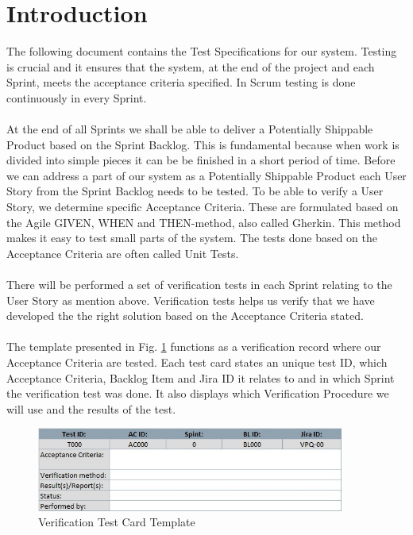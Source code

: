 \section{Introduction}
The following document contains the Test Specifications for our system. Testing is crucial and it ensures that the system, at the end of the project and each Sprint, meets the acceptance criteria specified. In Scrum testing is done continuously in every Sprint. \\
\\
At the end of all Sprints we shall be able to deliver a Potentially Shippable Product based on the Sprint Backlog. This is fundamental because when work is divided into simple pieces it can be be finished in a short period of time. Before we can address a part of our system as a Potentially Shippable Product each User Story from the Sprint Backlog needs to be tested. To be able to verify a User Story, we determine specific Acceptance Criteria. These are formulated based on the Agile GIVEN, WHEN and THEN-method, also called Gherkin. This method makes it easy to test small parts of the system. The tests done based on the Acceptance Criteria are often called Unit Tests.\\
\\
There will be performed a set of verification tests in each Sprint relating to the User Story as mention above. Verification tests helps us verify that we have developed the the right solution based on the Acceptance Criteria stated. \cite{ref1}\\
\\
The template presented in Fig. \ref{fig:testtemp} functions as a verification record where our Acceptance Criteria are tested. Each test card states an unique test ID, which Acceptance Criteria, Backlog Item and Jira ID it relates to and in which Sprint the verification test was done. It also  displays which Verification Procedure we will use and the results of the test.\\
\begin{figure}[h]
    \centering
        \includegraphics[width=0.9\textwidth]{VAPIQ-PICTURES/testtemp}
        \caption{Verification Test Card Template}
        \label{fig:testtemp}
\end{figure}
